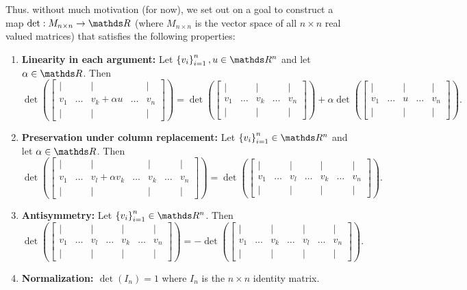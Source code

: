 Thus. without much motivation (for now), we set out on a goal to construct
a map $\det:M_{n\times n}\to\R$ (where $M_{n\times n}$ is the vector
space of all $n\times n$ real valued matrices) that satisfies the
following properties:
\begin{enumerate}
\item \textbf{Linearity in each argument: }Let $\left\{ v_{i}\right\} _{i=1}^{n},u\in\R^{n}$\textbf{
}and let $\alpha\in\R$. Then\textbf{
\[
\det\left(\left[\begin{array}{ccccc}
| &  & | &  & |\\
v_{1} & \ldots & v_{k}+\alpha u & \ldots & v_{n}\\
| &  & | &  & |
\end{array}\right]\right)=\det\left(\left[\begin{array}{ccccc}
| &  & | &  & |\\
v_{1} & \ldots & v_{k} & \ldots & v_{n}\\
| &  & | &  & |
\end{array}\right]\right)+\alpha\det\left(\left[\begin{array}{ccccc}
| &  & | &  & |\\
v_{1} & \ldots & u & \ldots & v_{n}\\
| &  & | &  & |
\end{array}\right]\right).
\]
}
\item \textbf{Preservation under column replacement:} Let $\left\{ v_{i}\right\} _{i=1}^{n}\in\R^{n}$\textbf{
}and let $\alpha\in\R$. Then
\[
\det\left(\left[\begin{array}{ccccccc}
| &  & | &  & | &  & |\\
v_{1} & \ldots & v_{l}+\alpha v_{k} & \ldots & v_{k} & \ldots & v_{n}\\
| &  & | &  & | &  & |
\end{array}\right]\right)=\det\left(\left[\begin{array}{ccccccc}
| &  & | &  & | &  & |\\
v_{1} & \ldots & v_{l} & \ldots & v_{k} & \ldots & v_{n}\\
| &  & | &  & | &  & |
\end{array}\right]\right).
\]
\item \textbf{Antisymmetry: }Let $\left\{ v_{i}\right\} _{i=1}^{n}\in\R^{n}$.
Then
\[
\det\left(\left[\begin{array}{ccccccc}
| &  & | &  & | &  & |\\
v_{1} & \ldots & v_{l} & \ldots & v_{k} & \ldots & v_{n}\\
| &  & | &  & | &  & |
\end{array}\right]\right)=-\det\left(\left[\begin{array}{ccccccc}
| &  & | &  & | &  & |\\
v_{1} & \ldots & v_{k} & \ldots & v_{l} & \ldots & v_{n}\\
| &  & | &  & | &  & |
\end{array}\right]\right).
\]
\item \textbf{Normalization: $\det\left(I_{n}\right)=1$ }where $I_{n}$
is the $n\times n$ identity matrix.
\end{enumerate}
